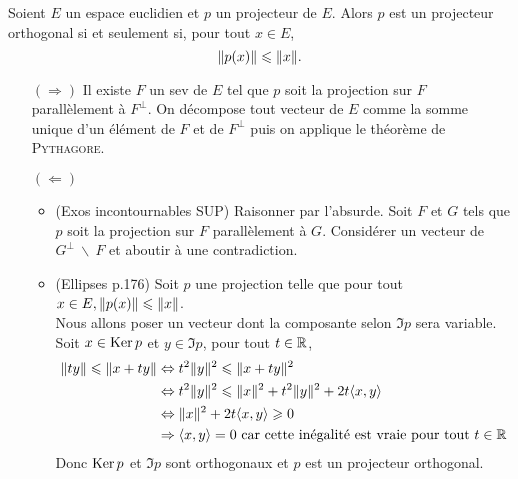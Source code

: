 \begin{prop}
    Soient $E$ un espace euclidien et $p$ un projecteur de $E$. Alors $p$ est un projecteur orthogonal si et seulement si, pour tout $x \in E$,
    $$\Vert p(x) \Vert \leqslant \Vert x \Vert.$$
\end{prop}

\begin{preuve}
    \begin{itemize}
        \item[$(\Rightarrow)$] Il existe $F$ un sev de $E$ tel que $p$ soit la projection sur $F$ parallèlement à $F^\perp$. On décompose tout vecteur de $E$ comme la somme unique d'un élément de $F$ et de $F^\perp$ puis on applique le théorème de \textsc{Pythagore}. 
        \item[$(\Leftarrow)$]
        \begin{itemize}
            \item (Exos incontournables SUP) Raisonner par l'absurde. Soit $F$ et $G$ tels que $p$ soit la projection sur $F$ parallèlement à $G$. Considérer un vecteur de $G^\perp\ \backslash\ F$ et aboutir à une contradiction.
            \item (Ellipses p.176) Soit $p$ une projection telle que pour tout $x \in E, \Vert p(x) \Vert \leqslant \Vert x \Vert$. \\
            Nous allons poser un vecteur dont la composante selon $\Im p$ sera variable.
            Soit $x \in \mathrm{Ker}\, p$ et $y \in \Im p$, pour tout $t \in \mathbb{R}$, 
            \begin{align*}
                \Vert ty \Vert \leqslant \Vert x + ty \Vert &\Leftrightarrow t^2 \Vert y \Vert^2 \leqslant \Vert x+ty \Vert^2 \\
                &\Leftrightarrow t^2 \Vert y \Vert^2 \leqslant \Vert x \Vert^2 + t^2 \Vert y \Vert^2 + 2t \langle x, y \rangle \\
                &\Leftrightarrow \Vert x \Vert^2 + 2t \langle x, y \rangle \geqslant 0 \\
                &\Rightarrow \langle x, y \rangle = 0 \text{ car cette inégalité est vraie pour tout } t \in \mathbb{R}
            \end{align*}
            Donc $\mathrm{Ker}\, p$ et $\Im p$ sont orthogonaux et $p$ est un projecteur orthogonal.
        \end{itemize}
    \end{itemize}
\end{preuve}

